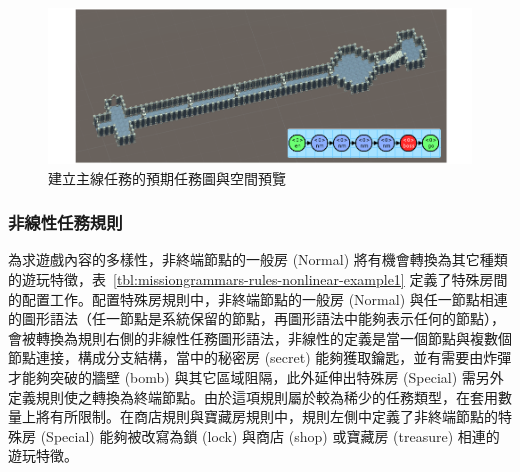 \begin{figure}[!htb]
  \begin{center}
    \includegraphics[width=1.0\textwidth]{figures/missiongrammars-rules-linear-preview.png}
    \caption{建立主線任務的預期任務圖與空間預覽}
    \label{fig:missiongrammars-rules-linear-preview}
  \end{center}
\end{figure}

\subsubsection{非線性任務規則}
\label{sssec:method-missiongrammars-rules-nonlinearrules}

為求遊戲內容的多樣性，非終端節點的一般房 (Normal) 將有機會轉換為其它種類的遊玩特徵，表~\ref{tbl:missiongrammars-rules-nonlinear-example1} 定義了特殊房間的配置工作。配置特殊房規則中，非終端節點的一般房 (Normal) 與任一節點相連的圖形語法（任一節點是系統保留的節點，再圖形語法中能夠表示任何的節點），會被轉換為規則右側的非線性任務圖形語法，非線性的定義是當一個節點與複數個節點連接，構成分支結構，當中的秘密房 (secret) 能夠獲取鑰匙，並有需要由炸彈才能夠突破的牆壁 (bomb) 與其它區域阻隔，此外延伸出特殊房 (Special) 需另外定義規則使之轉換為終端節點。由於這項規則屬於較為稀少的任務類型，在套用數量上將有所限制。在商店規則與寶藏房規則中，規則左側中定義了非終端節點的特殊房 (Special) 能夠被改寫為鎖 (lock) 與商店 (shop) 或寶藏房 (treasure) 相連的遊玩特徵。

